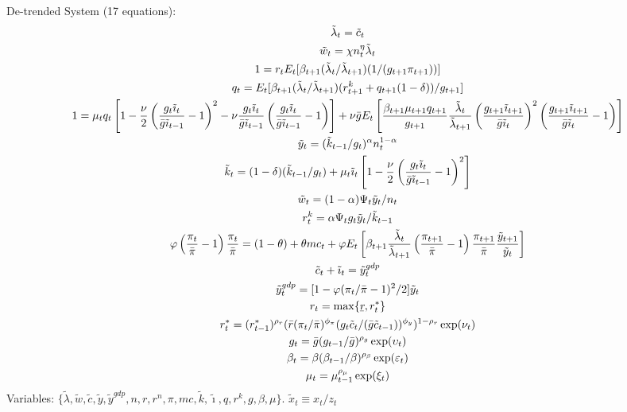 \documentclass[12pt, final]{article}
\newcommand{\ubar}[1]{\underaccent{\bar}{#1}}
\begin{document}
\noindent De-trended System (17 equations):
\scriptsize\begin{gather}
  \tilde{\lambda}_t = \tilde{c}_t\\
  \tilde{w}_t=\chi n_t^\eta\tilde{\lambda}_t \\
  1= r_tE_t[\beta_{t+1}(\tilde{\lambda}_t/\tilde{\lambda}_{t+1})(1/(g_{t+1}\pi_{t+1}))]\\
  q_t = E_t[\beta_{t+1}(\tilde{\lambda}_t/\tilde{\lambda}_{t+1})(r_{t+1}^k+q_{t+1}(1-\delta))/g_{t+1}]\\
  1 = \mu_tq_t\left[1-\frac{\nu}{2}\left(\frac{g_t\tilde{\imath}_t}{\bar{g}\tilde{\imath}_{t-1}}-1\right)^2-\nu\frac{g_t\tilde{\imath}_t}{\bar{g}\tilde{\imath}_{t-1}} \left(\frac{g_t\tilde{\imath}_t}{\bar{g}\tilde{\imath}_{t-1}}-1\right)\right]+\nu\bar{g}
  E_t\left[\frac{\beta_{t+1}\mu_{t+1}q_{t+1}}{g_{t+1}}\frac{\tilde{\lambda}_t}{\tilde{\lambda}_{t+1}}\left(\frac{g_{t+1}\tilde{\imath}_{t+1}}{\bar{g}\tilde{\imath}_t}\right)^2\left(\frac{g_{t+1}\tilde{\imath}_{t+1}}{\bar{g}\tilde{\imath}_t}-1\right)\right]\\
  \tilde{y}_t=(\tilde{k}_{t-1}/g_t)^\alpha n_t^{1-\alpha}\\
  \tilde{k}_t=(1-\delta)(\tilde{k}_{t-1}/g_t)+\mu_t\tilde{\imath}_t\left[1-\frac{\nu}{2}\left(\frac{g_t\tilde{\imath}_t}{\bar{g}\tilde{\imath}_{t-1}}-1\right)^2\right]\\
  \tilde{w}_t = (1-\alpha)\Psi_t\tilde{y}_t/n_t\\
  r_t^k = \alpha\Psi_tg_t\tilde{y}_t/\tilde{k}_{t-1}\\  
  \varphi\left(\frac{\pi_t}{\bar{\pi}}-1\right)\frac{\pi_t}{\bar{\pi}} = (1-\theta) + \theta mc_t + \varphi E_t\left[\beta_{t+1}\frac{\tilde{\lambda}_t}{\tilde{\lambda}_{t+1}}\left(\frac{\pi_{t+1}}{\bar{\pi}}-1\right)\frac{\pi_{t+1}}{\bar{\pi}}\frac{\tilde{y}_{t+1}}{\tilde{y}_t}\right]\\ \tilde{c}_t+\tilde{\imath}_t=\tilde{y}_t^{gdp}\\  
  \tilde{y}_t^{gdp}=[1-\varphi(\pi_t/\bar{\pi}-1)^2/2]\tilde{y}_t\\
   r_t=\max\{\ubar{r},r_t^*\}\\
   r_t^*=(r_{t-1}^*)^{\rho_r}(\bar{r}(\pi_t/\bar{\pi})^{\phi_\pi}(g_t\tilde{c}_t/(\bar{g}\tilde{c}_{t-1}))^{\phi_y})^{1-\rho_r}\exp(\nu_t)\\
  g_t=\bar{g}(g_{t-1}/\bar{g})^{\rho_g}\exp(\upsilon_t)\\
  \beta_t=\beta(\beta_{t-1}/\beta)^{\rho_\beta}\exp(\varepsilon_t)\\
  \mu_t=\mu_{t-1}^{\rho_\mu}\exp(\xi_t)
\end{gather}\normalsize
Variables: $\{\tilde{\lambda},\tilde{w},\tilde{c},\tilde{y},\tilde{y}^{gdp},n,r,r^n,\pi,mc,\tilde{k},\tilde{\imath},q,r^k,g,\beta,\mu\}$. $\tilde{x}_t\equiv x_t/z_t$
\end{document}
